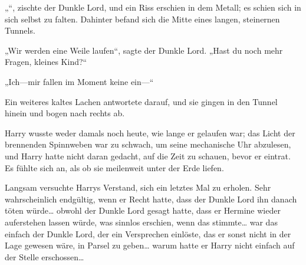 „“, zischte der Dunkle Lord, und ein Riss erschien in dem Metall; es schien sich in sich selbst zu falten. Dahinter befand sich die Mitte eines langen, steinernen Tunnels.


„Wir werden eine Weile laufen“, sagte der Dunkle Lord. „Hast du noch mehr Fragen, kleines Kind?“

„Ich—mir fallen im Moment keine ein—“

Ein weiteres kaltes Lachen antwortete darauf, und sie gingen in den Tunnel hinein und bogen nach rechts ab.

Harry wusste weder damals noch heute, wie lange er gelaufen war; das Licht der brennenden Spinnweben war zu schwach, um seine mechanische Uhr abzulesen, und Harry hatte nicht daran gedacht, auf die Zeit zu schauen, bevor er eintrat. Es fühlte sich an, als ob sie meilenweit unter der Erde liefen.

Langsam versuchte Harrys Verstand, sich ein letztes Mal zu erholen.
Sehr wahrscheinlich endgültig, wenn er Recht hatte, dass der Dunkle Lord ihn danach töten würde… obwohl der Dunkle Lord gesagt hatte, dass er Hermine wieder auferstehen lassen würde, was sinnlos erschien, wenn das stimmte… war das einfach der Dunkle Lord, der ein Versprechen einlöste, das er sonst nicht in der Lage gewesen wäre, in Parsel zu geben… warum hatte er Harry nicht einfach auf der Stelle erschossen…

